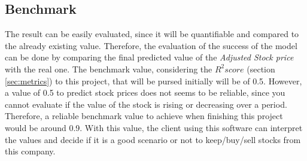 \subsection{Benchmark}
The result can be easily evaluated, since it will be quantifiable and compared to the already existing value. Therefore, the evaluation of the success of the model can be done by comparing the final
predicted value of the \emph{Adjusted Stock price} with the real one. The benchmark value, considering the $R^2 score$ (section \ref{sec:metrics}) to this project, that will be pursed initially will be of 0.5.
However, a value of 0.5 to predict stock prices does not seems to be reliable, since you cannot evaluate if the value of the stock is rising or decreasing over a period. 
Therefore, a reliable benchmark value to achieve when finishing this project would be around 0.9. With this value, the client using this software can interpret the values and decide if it is
a good scenario or not to keep/buy/sell stocks from this company.
\\